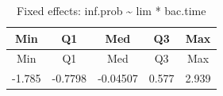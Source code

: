 \documentclass[]{article}
\begin{document}
\begin{longtable}[]{@{}ccccc@{}}
\caption{Fixed effects: inf.prob \textasciitilde{} lim *
bac.time}\tabularnewline
\toprule
\begin{minipage}[b]{0.08\columnwidth}\centering\strut
Min\strut
\end{minipage} & \begin{minipage}[b]{0.10\columnwidth}\centering\strut
Q1\strut
\end{minipage} & \begin{minipage}[b]{0.11\columnwidth}\centering\strut
Med\strut
\end{minipage} & \begin{minipage}[b]{0.07\columnwidth}\centering\strut
Q3\strut
\end{minipage} & \begin{minipage}[b]{0.07\columnwidth}\centering\strut
Max\strut
\end{minipage}\tabularnewline
\midrule
\endfirsthead
\toprule
\begin{minipage}[b]{0.08\columnwidth}\centering\strut
Min\strut
\end{minipage} & \begin{minipage}[b]{0.10\columnwidth}\centering\strut
Q1\strut
\end{minipage} & \begin{minipage}[b]{0.11\columnwidth}\centering\strut
Med\strut
\end{minipage} & \begin{minipage}[b]{0.07\columnwidth}\centering\strut
Q3\strut
\end{minipage} & \begin{minipage}[b]{0.07\columnwidth}\centering\strut
Max\strut
\end{minipage}\tabularnewline
\midrule
\endhead
\begin{minipage}[t]{0.08\columnwidth}\centering\strut
-1.785\strut
\end{minipage} & \begin{minipage}[t]{0.10\columnwidth}\centering\strut
-0.7798\strut
\end{minipage} & \begin{minipage}[t]{0.11\columnwidth}\centering\strut
-0.04507\strut
\end{minipage} & \begin{minipage}[t]{0.07\columnwidth}\centering\strut
0.577\strut
\end{minipage} & \begin{minipage}[t]{0.07\columnwidth}\centering\strut
2.939\strut
\end{minipage}\tabularnewline
\bottomrule
\end{longtable}
\end{document}
